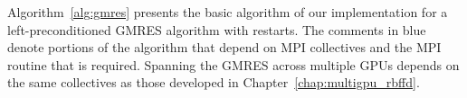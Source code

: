 Algorithm~\ref{alg:gmres} presents the basic algorithm of our implementation for a left-preconditioned GMRES algorithm with restarts. The comments in blue denote portions of the algorithm that depend on MPI collectives and the MPI routine that is required. 
Spanning the GMRES across multiple GPUs depends on the same collectives as those developed in Chapter~\ref{chap:multigpu_rbffd}. 


%


%







